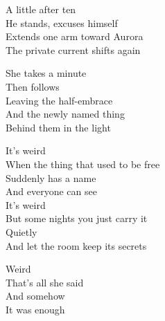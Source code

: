 \begin{lyrics}
A little after ten\\
He stands, excuses himself\\
Extends one arm toward Aurora\\
The private current shifts again

She takes a minute\\
Then follows\\
Leaving the half-embrace\\
And the newly named thing\\
Behind them in the light

It’s weird\\
When the thing that used to be free\\
Suddenly has a name\\
And everyone can see\\
It’s weird\\
But some nights you just carry it\\
Quietly\\
And let the room keep its secrets

Weird\\
That’s all she said\\
And somehow\\
It was enough
\end{lyrics}

